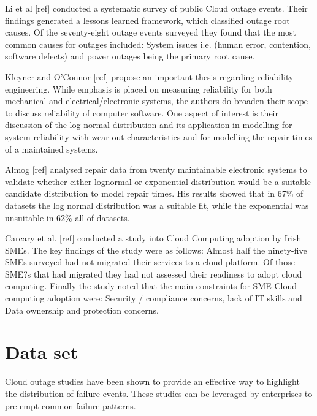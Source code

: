 \documentclass[conference]{IEEEtran}
\begin{document}
Li et al [ref] conducted a systematic survey of public Cloud outage events. Their findings generated a lessons learned framework, which classified outage root causes. Of the seventy-eight outage events surveyed they found that the most common causes for outages included: System issues i.e. (human error, contention, software defects) and power outages being the primary root cause. \par

Kleyner and O'Connor [ref] propose an important thesis regarding reliability engineering. While emphasis is placed on measuring reliability for both mechanical and electrical/electronic systems, the authors do broaden their scope to discuss reliability of computer software. One aspect of interest is their discussion of the log normal distribution and its application in modelling for system reliability with wear out characteristics and for modelling the repair times of a maintained systems. \par

Almog [ref] analysed repair data from twenty maintainable electronic systems to validate whether either lognormal or exponential distribution would be a suitable candidate distribution to model repair times. His results showed that in 67\% of datasets the log normal distribution was a suitable fit, while the exponential was unsuitable in 62\% all of datasets. \par

Carcary et al. [ref] conducted a study into Cloud Computing adoption by Irish SMEs. The key findings of the study were as follows: Almost half the ninety-five SMEs surveyed had not migrated their services to a cloud platform. Of those SME?s that had migrated they had not assessed their readiness to adopt cloud computing. Finally the study noted that the main constraints for SME Cloud computing adoption were: Security / compliance concerns, lack of IT skills and Data ownership and protection concerns. \par


\section{Data set}

Cloud outage studies have been shown to provide an effective way to highlight the distribution of failure events. These studies can be leveraged by enterprises to pre-empt common failure patterns. \par
\end{document}
